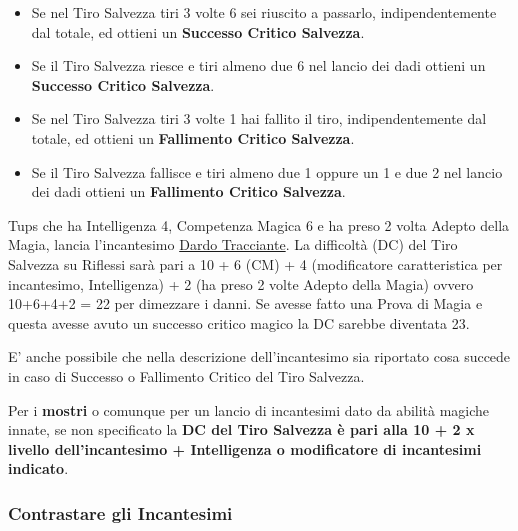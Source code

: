 \begin{multicols}{2}
\begin{itemize}[leftmargin=*]
\item
Se nel Tiro Salvezza tiri 3 volte 6 sei riuscito a passarlo, indipendentemente dal totale, ed ottieni un \textbf{Successo Critico Salvezza}.

\item
Se il Tiro Salvezza riesce e tiri almeno due 6 nel lancio dei dadi ottieni un \textbf{Successo Critico Salvezza}.

\item
Se nel Tiro Salvezza tiri 3 volte 1 hai fallito il tiro, indipendentemente dal totale, ed ottieni un \textbf{Fallimento Critico Salvezza}.

\item
Se il Tiro Salvezza fallisce e tiri almeno due 1 oppure un 1 e due 2 nel lancio dei dadi ottieni un \textbf{Fallimento Critico Salvezza}. 

\end{itemize}

\begin{changemargin}{0.3cm}{0.3cm}\begin{tcolorbox}[title = Tups lancia Dardo Tracciante!]
Tups che ha Intelligenza 4, Competenza Magica 6 e ha preso 2 volta Adepto della Magia, lancia l'incantesimo \hyperlink{Dardo Tracciante}{Dardo Tracciante}. La difficoltà (DC) del Tiro Salvezza su Riflessi sarà pari a 10 + 6 (CM) + 4 (modificatore caratteristica per incantesimo, Intelligenza) + 2 (ha preso 2 volte Adepto della Magia) ovvero 10+6+4+2 = 22 per dimezzare i danni. Se avesse fatto una Prova di Magia e questa avesse avuto un successo critico magico la DC sarebbe diventata 23.
\end{tcolorbox}\end{changemargin}


E' anche possibile che nella descrizione dell'incantesimo sia riportato cosa succede in caso di Successo o Fallimento Critico del Tiro Salvezza.

Per i \textbf{mostri} o comunque per un lancio di incantesimi dato da abilità magiche innate, se non specificato la \textbf{DC del Tiro Salvezza è pari alla 10 + 2 x livello dell'incantesimo + Intelligenza o modificatore di incantesimi indicato}.\label{tirosalvezzainccmostro}


\subsubsection{Contrastare gli Incantesimi}\label{contrastareincantesimi}\hypertarget{contrastareincantesimi}{}


\end{multicols}
